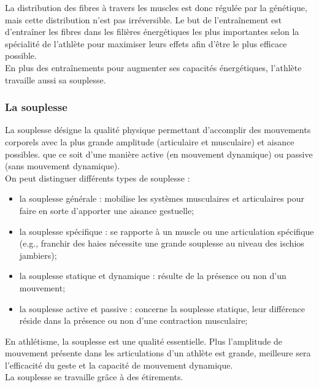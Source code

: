         La distribution des fibres à travers les muscles est donc régulée par la génétique, mais cette distribution n'est pas irréversible. Le but de l'entraînement est d'entraîner les fibres dans les filières énergétiques les plus importantes selon la spécialité de l'athlète pour maximiser leurs effets afin d'être le plus efficace possible. \\
        
        En plus des entraînements pour augmenter ses capacités énergétiques, l'athlète travaille aussi sa souplesse.\\
                

        \subsubsection{La souplesse}
        La souplesse désigne la qualité physique permettant d’accomplir des mouvements corporels avec la plus grande amplitude (articulaire et musculaire) et aisance possibles. que ce soit d’une manière active (en mouvement dynamique) ou passive (sans mouvement dynamique).\\
    
         On peut distinguer différents types de souplesse :
         \begin{itemize}
             \item la souplesse générale : mobilise les systèmes musculaires et articulaires pour faire en sorte d’apporter une aisance gestuelle;
             \item la souplesse spécifique : se rapporte à un muscle ou une articulation spécifique (e.g., franchir des haies nécessite une grande souplesse au niveau des ischios jambiers);
             \item la souplesse statique et dynamique : résulte de la présence ou non d’un mouvement;
             \item la souplesse active et passive : concerne la souplesse statique, leur différence réside dans la présence ou non d’une contraction musculaire;\\
         \end{itemize}

        En athlétisme, la souplesse est une qualité essentielle. Plus l'amplitude de mouvement présente dans les articulations d'un athlète est grande, meilleure sera l’efficacité du geste et la capacité de mouvement dynamique.\\

        La souplesse se travaille grâce à des étirements.\\
        
